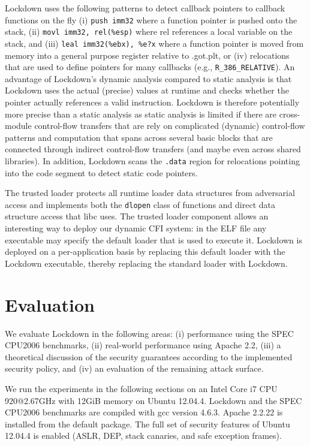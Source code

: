 \documentclass{acm_proc_article-sp}
\begin{document}
Lockdown uses the following patterns to detect callback pointers to callback
functions on the fly (i) \texttt{push imm32} where a function pointer is pushed
onto the stack, (ii) \texttt{movl imm32, rel(\%esp)} where rel references a
local variable on the stack, and (iii) \texttt{leal imm32(\%ebx), \%e?x} where a
function pointer is moved from memory into a general purpose register relative
to .got.plt, or (iv) relocations that are used to define pointers for many
callbacks (e.g., \texttt{R\_386\_RELATIVE}). An advantage of Lockdown's dynamic
analysis compared to static analysis is that Lockdown uses the actual (precise)
values at runtime and checks whether the pointer actually references a valid
instruction. Lockdown is therefore potentially more precise than a static
analysis as static analysis is limited if there are cross-module control-flow
transfers that are rely on complicated (dynamic) control-flow patterns and
computation that spans across several basic blocks that are connected through
indirect control-flow transfers (and maybe even across shared libraries). In
addition, Lockdown scans the \texttt{.data} region for relocations pointing into
the code segment to detect static code pointers.



The trusted loader protects all runtime loader data structures from adversarial
access and implements both the \texttt{dlopen} class of functions and direct
data structure access that libc uses.
The trusted loader component allows an interesting way to deploy our dynamic CFI
system: in the ELF file any executable may specify the default loader that is
used to execute it. Lockdown is deployed on a per-application basis by replacing
this default loader with the Lockdown executable, thereby replacing the standard
loader with Lockdown.


\section{Evaluation}\label{sec:eval}


We evaluate Lockdown in the following areas: (i) performance using the SPEC
CPU2006 benchmarks, (ii) real-world performance using Apache
2.2, (iii) a
theoretical discussion of the security guarantees according to the implemented
security policy, and (iv) an evaluation of the remaining attack surface. 

We run the experiments in the following sections on an Intel Core i7 CPU
920@2.67GHz with 12GiB memory on Ubuntu 12.04.4. Lockdown and the SPEC CPU2006
benchmarks are compiled with gcc version 4.6.3. Apache 2.2.22 is installed from the
default package. The full set of security features of Ubuntu 12.04.4 is enabled
(ASLR, DEP, stack canaries, and safe exception frames).
\end{document}
